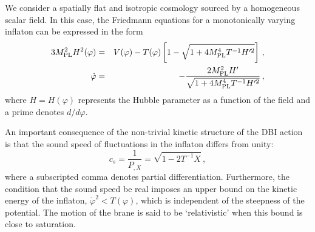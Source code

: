We consider a spatially flat and isotropic cosmology 
sourced by a homogeneous scalar field. 
In this case, the Friedmann equations for a monotonically 
varying inflaton can be expressed in the form \cite{brane6} 
% 
\begin{eqnarray}
\label{eq:Friedmann-dbiintro}
3 M_{\mathrm{PL}}^2 H^2(\varphi ) &=& V(\varphi ) -T(\varphi ) 
\left[ 1- \sqrt{1+4M_{\mathrm{PL}}^4T^{-1} H'^2} \right] \,,\\
\label{useful}
\dot{\varphi} &=& - \frac{2M_{\mathrm{PL}}^2H'}{\sqrt{1+4M_{\mathrm{PL}}^4 T^{-1} H'^2}} \, ,
\end{eqnarray}
% 
where $H=H(\varphi )$ represents the Hubble parameter
as a function of the field and a prime denotes $d/d\varphi$. 


An important consequence of the non-trivial kinetic structure 
of the DBI action is that the sound speed of fluctuations in the inflaton 
differs from unity:   
% 
\begin{equation}
\label{eq:csdefn-dbiintro}
c_s = \frac{1}{P_{,X}} = \sqrt{1 -2T^{-1}X}  \,,
\end{equation}
% 
where a subscripted comma denotes partial differentiation. 
Furthermore, the condition that the sound speed be real 
imposes an upper bound on the kinetic energy 
of the inflaton, $\dot{\varphi}^2 < T(\varphi)$, which 
is independent of the steepness of the potential.
The motion of the brane is said to be `relativistic' when this bound is 
close to saturation.
 

